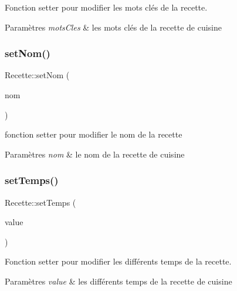 Fonction setter pour modifier les mots clés de la recette. 


\begin{DoxyParams}{Paramètres}
{\em mots\+Cles} & les mots clés de la recette de cuisine \\
\hline
\end{DoxyParams}
\mbox{\label{classRecette_a4880e64cbdc22a72600eee18cd0f921f}} 
\subsubsection{\texorpdfstring{set\+Nom()}{setNom()}}
{\footnotesize\ttfamily Recette\+::set\+Nom (\begin{DoxyParamCaption}\item[{const Q\+String \&}]{nom }\end{DoxyParamCaption})}



fonction setter pour modifier le nom de la recette 


\begin{DoxyParams}{Paramètres}
{\em nom} & le nom de la recette de cuisine \\
\hline
\end{DoxyParams}
\mbox{\label{classRecette_a51b797af44e9bc45811e44bd42f461af}} 
\subsubsection{\texorpdfstring{set\+Temps()}{setTemps()}}
{\footnotesize\ttfamily Recette\+::set\+Temps (\begin{DoxyParamCaption}\item[{const Q\+String \&}]{value }\end{DoxyParamCaption})}



Fonction setter pour modifier les différents temps de la recette. 


\begin{DoxyParams}{Paramètres}
{\em value} & les différents temps de la recette de cuisine \\
\hline
\end{DoxyParams}
\mbox{\label{classRecette_ac910b38482d259cba788f41669e765b1}} 
